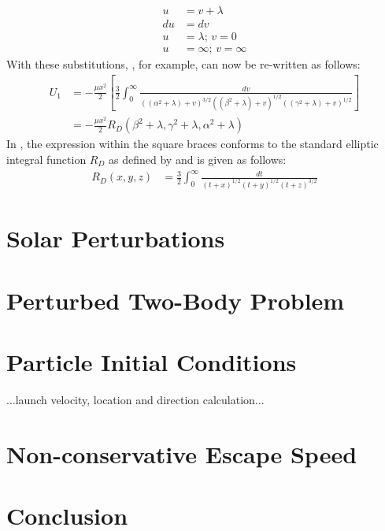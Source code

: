 \begin{align}
    u &= v + \lambda \\
    du &= dv \\
    u &= \lambda \text{; } v = 0 \\
    u &= \infty \text{; } v = \infty
\end{align}
With these substitutions, , for example, can now be re-written as follows:
\begin{align}
    U_1 &= -\frac{\mu x^2}{2} \left[\frac{3}{2} \int_{0}^{\infty} \frac{dv}{((\alpha^2 + \lambda) + v)^{3/2}((\beta^2 + \lambda) + v)^{1/2}((\gamma^2 + \lambda) + v)^{1/2}}\right]
    \label{eqn:ellipsoid_potential_split_1_mod} \\
    &= -\frac{\mu x^2}{2} R_D(\beta^2 + \lambda, \gamma^2 + \lambda, \alpha^2 + \lambda)
    \label{eqn:ellipsoid_potential_split_1_carlson}
\end{align}
In , the expression within the square braces conforms to the standard elliptic integral function $R_D$ as defined by \cite{carlsonEllipticIntegral} and is given as follows:
\begin{align}
    R_D(x, y, z) &= \frac{3}{2} \int_0^{\infty} \frac{dt}{(t+x)^{1/2}(t+y)^{1/2}(t+z)^{3/2}}
    \label{eqn:carlson_RD}
\end{align}


\section{Solar Perturbations}
\label{sec:solar_perturbations}

\section{Perturbed Two-Body Problem}
\label{sec:2BP}

\section{Particle Initial Conditions}
\label{sec:init_conditions}
...launch velocity, location and direction calculation...

\section{Non-conservative Escape Speed}
\label{sec:escape_speed_derivation}

\section{Conclusion}
\label{sec:dynamics_conclusion}

